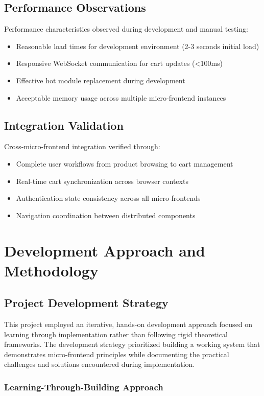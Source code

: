 \documentclass[12pt,a4paper]{report}
\begin{document}
\section{Performance Observations}
Performance characteristics observed during development and manual testing:
\begin{itemize}
\item Reasonable load times for development environment (2-3 seconds initial load)
\item Responsive WebSocket communication for cart updates (<100ms)
\item Effective hot module replacement during development
\item Acceptable memory usage across multiple micro-frontend instances
\end{itemize}

\section{Integration Validation}
Cross-micro-frontend integration verified through:
\begin{itemize}
\item Complete user workflows from product browsing to cart management
\item Real-time cart synchronization across browser contexts
\item Authentication state consistency across all micro-frontends
\item Navigation coordination between distributed components
\end{itemize}

\chapter{Development Approach and Methodology}
\section{Project Development Strategy}

This project employed an iterative, hands-on development approach focused on learning through implementation rather than following rigid theoretical frameworks. The development strategy prioritized building a working system that demonstrates micro-frontend principles while documenting the practical challenges and solutions encountered during implementation.

\subsection{Learning-Through-Building Approach}
\end{document}
